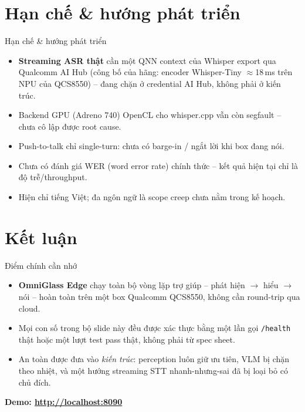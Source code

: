 \documentclass[aspectratio=169]{beamer}
\begin{document}
\section{Hạn chế \& hướng phát triển}

\begin{frame}{Hạn chế \& hướng phát triển}
  \begin{itemize}
    \item \textbf{Streaming ASR thật} cần một QNN context của Whisper export qua
          Qualcomm AI Hub (công bố của hãng: encoder Whisper-Tiny $\approx$18\,ms
          trên NPU của QCS8550) -- đang chặn ở credential AI Hub, không phải ở
          kiến trúc.
    \item Backend GPU (Adreno 740) OpenCL cho whisper.cpp vẫn còn segfault --
          chưa cô lập được root cause.
    \item Push-to-talk chỉ single-turn: chưa có barge-in / ngắt lời khi box
          đang nói.
    \item Chưa có đánh giá WER (word error rate) chính thức -- kết quả hiện tại
          chỉ là độ trễ/throughput.
    \item Hiện chỉ tiếng Việt; đa ngôn ngữ là scope creep chưa nằm trong kế
          hoạch.
  \end{itemize}
\end{frame}

\section{Kết luận}

\begin{frame}{Điểm chính cần nhớ}
  \begin{itemize}
    \item \textbf{OmniGlass Edge} chạy toàn bộ vòng lặp trợ giúp --
          phát hiện $\to$ hiểu $\to$ nói -- hoàn toàn trên một box Qualcomm
          QCS8550, không cần round-trip qua cloud.
    \item Mọi con số trong bộ slide này đều được xác thực bằng một lần gọi
          \texttt{/health} thật hoặc một lượt test pass thật, không phải từ
          spec sheet.
    \item An toàn được đưa vào \emph{kiến trúc}: perception luôn giữ ưu tiên,
          VLM bị chặn theo nhiệt, và một hướng streaming STT nhanh-nhưng-sai đã
          bị loại bỏ có chủ đích.
  \end{itemize}
  \vspace{10pt}
  \centering
  \Large\textbf{Demo: \url{http://localhost:8090}}
\end{frame}
\end{document}
